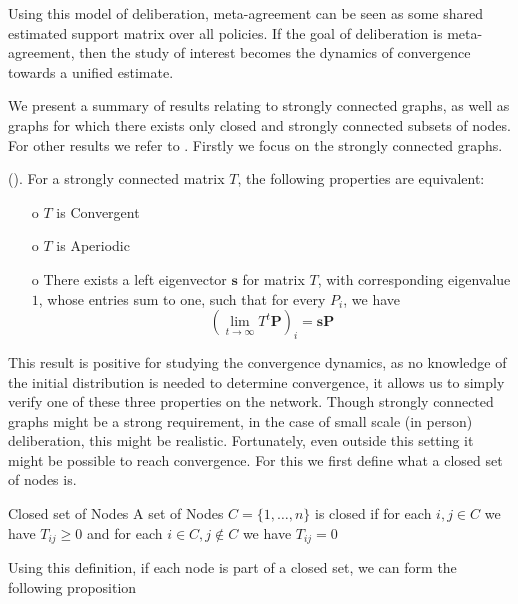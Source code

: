 Using this model of deliberation, meta-agreement can be seen as some shared estimated
support matrix over all policies. If the goal of deliberation is
meta-agreement, then the study of interest becomes the dynamics of convergence
towards a unified estimate. %

We present a summary of results relating to strongly connected graphs, as well
as graphs for which there exists only closed and strongly connected subsets of
nodes. For other results we refer to \citet{golubNaiveLearningSocial2010}.
Firstly we focus on the strongly connected graphs.

\begin{proposition}{(\citet{golubNaiveLearningSocial2010}).} For a strongly
	connected matrix \(T\), the following properties are equivalent:
	\begin{itemize} \item[o] \(T\) is Convergent \item[o] \(T\) is
			Aperiodic \item[o] There exists a left eigenvector
			\(\boldsymbol{s}\) for matrix \(T\), with corresponding
			eigenvalue \(1\), whose entries sum to one, such that for every
			$P_i$, we have \[\left(\lim_{t\to \infty}T^{t}
				\boldsymbol{P}\right)_{i} = \boldsymbol{s}\boldsymbol{P}\]
	\end{itemize} \end{proposition}

This result is positive for studying the convergence dynamics, as no knowledge
of the initial distribution is needed to determine convergence, it allows us to
simply verify one of these three properties on the network. Though strongly
connected graphs might be a strong requirement, in the case of small scale (in
person) deliberation, this might be realistic. Fortunately, even outside this
setting it might be possible to reach convergence. For this we first define
what a closed set of nodes is.

\begin{definition}{Closed set of Nodes}{} A set of Nodes \(C = \{1, \dots,
	n\}\) is closed if for each \(i,j \in C\) we have $T_{ij} \geq 0$ and for each
	\(i \in C, j \notin C\) we have \(T_{ij} = 0\) \end{definition}

Using this definition, if each node is part of a closed set, we can form the
following proposition

